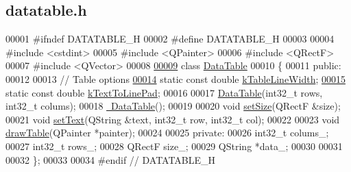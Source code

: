 \hypertarget{datatable_8h_source}{}\subsection{datatable.\+h}
\label{datatable_8h_source}

\begin{DoxyCode}
00001 \textcolor{preprocessor}{#ifndef DATATABLE\_H}
00002 \textcolor{preprocessor}{#define DATATABLE\_H}
00003 
00004 \textcolor{preprocessor}{#include <cstdint>}
00005 \textcolor{preprocessor}{#include <QPainter>}
00006 \textcolor{preprocessor}{#include <QRectF>}
00007 \textcolor{preprocessor}{#include <QVector>}
00008 
\hypertarget{datatable_8h_source_l00009}{}\hyperlink{class_data_table}{00009} \textcolor{keyword}{class }\hyperlink{class_data_table}{DataTable}
00010 \{
00011 \textcolor{keyword}{public}:
00012 
00013   \textcolor{comment}{// Table options}
\hypertarget{datatable_8h_source_l00014}{}\hyperlink{class_data_table_aa4aed4c624ca9a8e68c9ecc4d2b43458}{00014}   \textcolor{keyword}{static} \textcolor{keyword}{const} \textcolor{keywordtype}{double} \hyperlink{class_data_table_aa4aed4c624ca9a8e68c9ecc4d2b43458}{kTableLineWidth};
\hypertarget{datatable_8h_source_l00015}{}\hyperlink{class_data_table_ab0703eeee2cf6e45fc74356432434ac6}{00015}   \textcolor{keyword}{static} \textcolor{keyword}{const} \textcolor{keywordtype}{double} \hyperlink{class_data_table_ab0703eeee2cf6e45fc74356432434ac6}{kTextToLinePad};
00016 
00017   \hyperlink{class_data_table_a9d37b5de498e8436f74cd51e51ec4948}{DataTable}(int32\_t rows, int32\_t colums);
00018   \hyperlink{class_data_table_a86095a8a5abd63d50603d4ca0db253d7}{~DataTable}();
00019 
00020   \textcolor{keywordtype}{void} \hyperlink{class_data_table_a8a8cd6f95caaaff148993f8e28eeb703}{setSize}(QRectF &size);
00021   \textcolor{keywordtype}{void} \hyperlink{class_data_table_aee0d28c77116b51360f0124a529cb3ff}{setText}(QString &text, int32\_t row, int32\_t col);
00022 
00023   \textcolor{keywordtype}{void} \hyperlink{class_data_table_a3a3695e88dcd4d4aad5cc941ec7e6e55}{drawTable}(QPainter *painter);
00024 
00025 \textcolor{keyword}{private}:
00026   int32\_t colums\_;
00027   int32\_t rows\_;
00028   QRectF size\_;
00029   QString *data\_;
00030 
00031 
00032 \};
00033 
00034 \textcolor{preprocessor}{#endif // DATATABLE\_H}
\end{DoxyCode}
